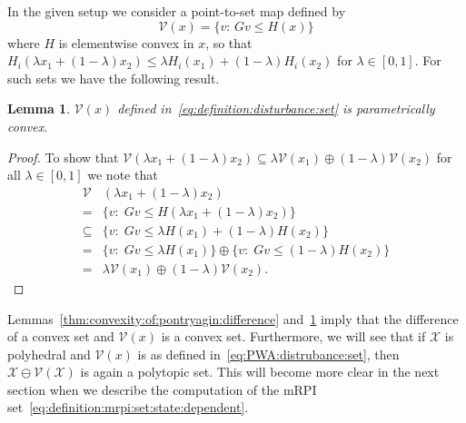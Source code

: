 \documentclass[letterpaper, 10pt, conference]{ieeeconf/ieeeconf} %
\newtheorem{thm}{Lemma}[section]
\begin{document}
    In the given setup we consider a point-to-set map defined by
    \begin{equation}\label{eq:definition:disturbance:set}
      \mathcal V(x) = \{v:\,G v \leq H(x)\}
    \end{equation}
    where $H$ is elementwise convex in $x$, so that 
    $H_i(\lambda x_1+(1-\lambda)x_2)\leq \lambda H_i(x_1)+(1-\lambda)H_i(x_2)$ for 
    $\lambda\in[0,1]$.  For such sets we have the following result.
    \begin{thm}\label{thm:convex:parametric:set}
      $\mathcal V (x)$ defined in~\eqref{eq:definition:disturbance:set} is parametrically convex.
    \end{thm}
    \begin{proof}
      To show that $\mathcal V(\lambda x_1 + (1-\lambda)x_2)\subseteq 
      \lambda\mathcal V(x_1) \oplus(1-\lambda)\mathcal V(x_2)$ for all $\lambda \in [0,1]$ we note that
        \begin{align*}
        \mathcal V&(\lambda x_1 + (1-\lambda)x_2)\\
        =& \{v:\; G v \leq H(\lambda x_1 + (1-\lambda)x_2)\}\\
        \subseteq& \{v:\;Gv\leq\lambda H(x_1)+(1-\lambda) H(x_2)\}\\
        =&\{v:\;Gv\leq\lambda H(x_1)\}\oplus\{v
        :\;Gv\leq(1-\lambda)H(x_2)\}\\
        =&\lambda\mathcal V(x_1)\oplus(1-\lambda)\mathcal V(x_2).
        \end{align*}
\baselineskip
    \end{proof} 
\def\genmat{\Xi} \def\genvec{\xi}Lemmas~\ref{thm:convexity:of:pontryagin:difference} 
and~\ref{thm:convex:parametric:set} imply that the difference of a convex set and 
$\mathcal V(x)$ is a convex set.
Furthermore, we will see that if $\mathcal X$ is polyhedral and $\mathcal 
V(x)$ is as defined in~\eqref{eq:PWA:distrubance:set}, then $\mathcal X\ominus\mathcal V(\mathcal X)$ is 
again a polytopic set. This will become more clear in the next section when we describe 
the computation of the mRPI set~\eqref{eq:definition:mrpi:set:state:dependent}.
\end{document}
